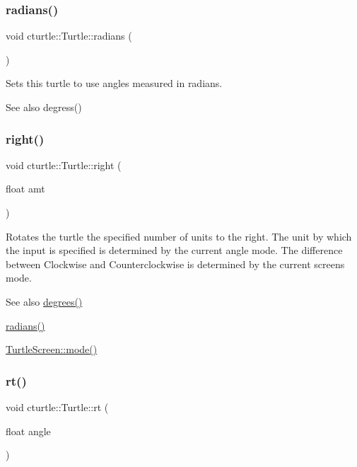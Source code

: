 \subsubsection{\texorpdfstring{radians()}{radians()}}
{\footnotesize\ttfamily void cturtle\+::\+Turtle\+::radians (\begin{DoxyParamCaption}{ }\end{DoxyParamCaption})\hspace{0.3cm}{\ttfamily [inline]}}

Sets this turtle to use angles measured in radians. \begin{DoxySeeAlso}{See also}
degress() 
\end{DoxySeeAlso}
\mbox{\label{classcturtle_1_1Turtle_a3586f116fccc417ffa74c115ec3eef54}} 
\subsubsection{\texorpdfstring{right()}{right()}}
{\footnotesize\ttfamily void cturtle\+::\+Turtle\+::right (\begin{DoxyParamCaption}\item[{float}]{amt }\end{DoxyParamCaption})}



Rotates the turtle the specified number of units to the right. The unit by which the input is specified is determined by the current angle mode. The difference between Clockwise and Counterclockwise is determined by the current screen\textquotesingle{}s mode. 

\begin{DoxySeeAlso}{See also}
\hyperlink{classcturtle_1_1Turtle_aa68704b24017c6a8cda41ff292ecafde}{degrees()} 

\hyperlink{classcturtle_1_1Turtle_a9c266e318f05dc5d45ddbeb830a373fa}{radians()} 

\hyperlink{classcturtle_1_1InteractiveTurtleScreen_a1c666afe65211cf9eedaffa17206a697}{Turtle\+Screen\+::mode()} 
\end{DoxySeeAlso}
\mbox{\label{classcturtle_1_1Turtle_a5416304d65c9bbebe0fabd9914123a79}} 
\subsubsection{\texorpdfstring{rt()}{rt()}}
{\footnotesize\ttfamily void cturtle\+::\+Turtle\+::rt (\begin{DoxyParamCaption}\item[{float}]{angle }\end{DoxyParamCaption})\hspace{0.3cm}{\ttfamily [inline]}}



